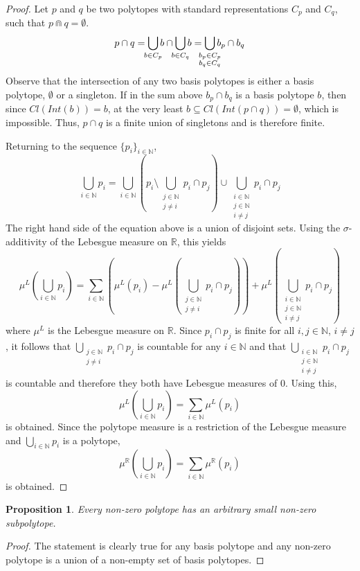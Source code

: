 \documentclass{article}
\newtheorem*{proposition}{Proposition}
\newcommand{\R}{\mathbb{R}}
\newcommand{\N}{\mathbb{N}}
\newcommand{\bcap}{\Cap}
\begin{document}
\begin{proof}
  Let $p$ and $q$ be two polytopes with standard representations $C_p$ and $C_q$, such that $p \bcap q = \emptyset$.
  \[p \cap q = \bigcup_{\mathclap{b \in C_p}}b \cap \bigcup_{\mathclap{b \in C_q}}b = \bigcup_{\mathclap{\substack{b_p \in C_p\\b_q \in C_q}}}b_p \cap b_q\]
  Observe that the intersection of any two basis polytopes is either a basis polytope, $\emptyset$ or a singleton. If in the sum above $b_p \cap b_q$ is a basis polytope $b$, then since $Cl(Int(b)) = b$, at the very least $b \subseteq Cl(Int(p \cap q)) = \emptyset$, which is impossible. Thus, $p \cap q$ is a finite union of singletons and is therefore finite.

  Returning to the sequence $\{p_i\}_{i \in \N}$,
  \[
  \bigcup_{i \in \N}p_i = \bigcup_{i \in \N}\left(p_i \setminus \bigcup_{\substack{j \in \N\\j \neq i}}p_i \cap p_j \right) \cup \bigcup_{\substack{i \in \N \\ j \in \N\\i \neq j}}p_i \cap p_j
  \]
  The right hand side of the equation above is a union of disjoint sets. Using the $\sigma$-additivity of the Lebesgue measure on $\R$, this yields
  \[
  \mu^L\left(\bigcup_{i \in \N}p_i\right) = \sum_{i \in \N}\left(\mu^L(p_i) - \mu^L\left(\bigcup_{\substack{j \in \N\\j \neq i}}p_i \cap p_j\right) \right) + \mu^L\left(\bigcup_{\substack{i \in \N \\ j \in \N\\i \neq j}}p_i \cap p_j\right)
  \]
  where $\mu^L$ is the Lebesgue measure on $\R$. Since $p_i \cap p_j$ is finite for all $i,j \in \N$, $i \neq j$, it follows that $\bigcup_{\substack{j \in \N\\j \neq i}}p_i \cap p_j$ is countable for any $i \in \N$ and that $\bigcup_{\substack{i \in \N \\ j \in \N\\i \neq j}}p_i \cap p_j$ is countable and therefore they both have Lebesgue measures of $0$. Using this,
  \[
  \mu^L\left(\bigcup_{i \in \N}p_i\right) = \sum_{i \in \N}\mu^L(p_i)
  \]
  is obtained. Since the polytope measure is a restriction of the Lebesgue measure and $\bigcup_{i \in \N}p_i$ is a polytope,
  \[
  \mu^\R\left(\bigcup_{i \in \N}p_i\right) = \sum_{i \in \N}\mu^\R(p_i)
  \]
  is obtained.
\end{proof}

\begin{proposition}
 Every non-zero polytope has an arbitrary small non-zero subpolytope.
\end{proposition}
\begin{proof}
The statement is clearly true for any basis polytope and any non-zero polytope is a union of a non-empty set of basis polytopes.
\end{proof}
\end{document}
